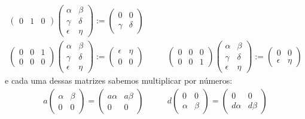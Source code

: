 \begin{ex}
\begin{align*}
\begin{pmatrix}
		0&1&0
		\end{pmatrix}\begin{pmatrix}
		\alpha &\beta\\
		\gamma & \delta\\
		\epsilon & \eta	
		\end{pmatrix}:=\begin{pmatrix}
		0 & 0\\
		\gamma &\delta
		\end{pmatrix}\\		
		\begin{pmatrix}
		0&0&1\\
		0&0&0
		\end{pmatrix}\begin{pmatrix}
		\alpha &\beta\\
		\gamma & \delta\\
		\epsilon & \eta	
		\end{pmatrix}:=\begin{pmatrix}
		\epsilon &\eta\\
		0 & 0	
		\end{pmatrix}\quad\quad&\begin{pmatrix}
		0&0&0\\
		0&0&1
		\end{pmatrix}\begin{pmatrix}
		\alpha &\beta\\
		\gamma & \delta\\
		\epsilon & \eta	
		\end{pmatrix}:=\begin{pmatrix}
		0 & 0\\
		\epsilon &\eta
		\end{pmatrix}
	\end{align*}e cada uma dessas matrizes sabemos multiplicar por números:
	\begin{align*}
	a\begin{pmatrix}
	\alpha &\beta\\
	0 & 0	
	\end{pmatrix}=\begin{pmatrix}
	a\alpha &a\beta\\
	0 & 0	
	\end{pmatrix} \quad\quad& d\begin{pmatrix}
	0 & 0\\
	\alpha &\beta
	\end{pmatrix}=\begin{pmatrix}
	0 & 0\\
	d\alpha&d\beta
	\end{pmatrix}\\

\end{align*}
\end{ex}
